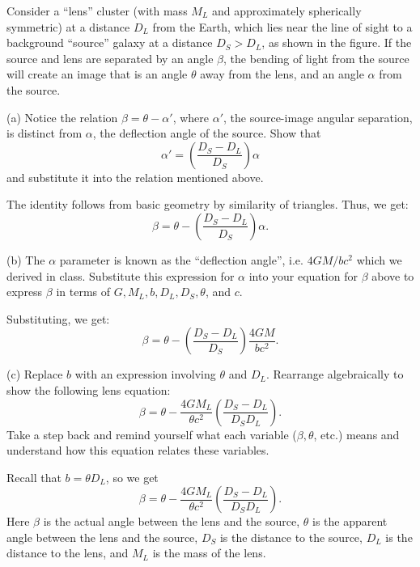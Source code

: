 \documentclass{../../templates/lkx_pset}
\begin{document}
\begin{solution}
  Consider a ``lens'' cluster (with mass $M_L$ and approximately spherically symmetric) at a distance $D_L$ from the Earth, which lies near the line of sight to a background ``source'' galaxy at a distance $D_S > D_L$, as shown in the figure. If the source and lens are separated by an angle $\beta$, the bending of light from the source will create an image that is an angle $\theta$ away from the lens, and an angle $\alpha$ from the source.
  \begin{part}{(a)}
    Notice the relation $\beta = \theta - \alpha'$, where $\alpha'$, the source-image angular separation, is distinct from $\alpha$, the deflection angle of the source. Show that
    \[
      \alpha' = \left(\frac{D_S - D_L}{D_S}\right)\alpha
    \]
    and substitute it into the relation mentioned above.
  \end{part}

  The identity follows from basic geometry by similarity of triangles. Thus, we get:
  \[
    \beta = \theta - \left(\frac{D_S - D_L}{D_S}\right)\alpha.
  \]

  \begin{part}{(b)}
    The $\alpha$ parameter is known as the ``deflection angle'', i.e. $4GM/bc^2$ which we derived in class. Substitute this expression for $\alpha$ into your equation for $\beta$ above to express $\beta$ in terms of $G, M_L, b, D_L, D_S, \theta$, and $c$.
  \end{part}

  Substituting, we get:
  \[
    \beta = \theta - \left(\frac{D_S - D_L}{D_S}\right)\frac{4GM}{bc^2}.
  \]

  \begin{part}{(c)}
    Replace $b$ with an expression involving $\theta$ and $D_L$. Rearrange algebraically to show the following lens equation:
    \[
      \beta = \theta - \frac{4GM_L}{\theta c^2}\left(\frac{D_S - D_L}{D_S D_L}\right).
    \]
    Take a step back and remind yourself what each variable ($\beta, \theta$, etc.) means and understand how this equation relates these variables.
  \end{part}
  Recall that $b = \theta D_L$, so we get
  \[
    \beta = \theta - \frac{4GM_L}{\theta c^2}\left(\frac{D_S - D_L}{D_S D_L}\right).
  \]
  Here $\beta$ is the actual angle between the lens and the source, $\theta$ is the apparent angle between the lens and the source, $D_S$ is the distance to the source, $D_L$ is the distance to the lens, and $M_L$ is the mass of the lens.
\end{solution}
\end{document}
